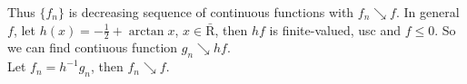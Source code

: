 \documentclass[a4paper,11pt]{article}
\begin{document}
\begin{enumerate}
\begin{enumerate}
Thus $\{ f_n \}$ is decreasing sequence of continuous functions with $f_n \searrow f$. In general $f$, let $h(x) = -\frac{1}{2} + \arctan x$, $x \in \bar{\mathrm{R}}$, then $hf$ is finite-valued, usc and $f \leq 0$. So we can find contiuous function $g_n \searrow hf$.\\
Let $f_n = h^{-1}g_n$, then $f_n \searrow f$.

\end{enumerate}



\end{enumerate}
\end{document}
